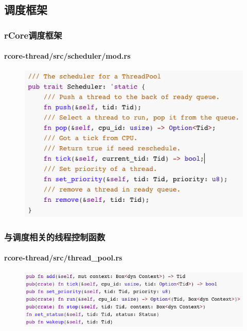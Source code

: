 \subsection{调度框架} %
\begin{frame}[fragile]
    \frametitle{rCore调度框架}
    \framesubtitle{rcore-thread/src/scheduler/mod.rs}
    \begin{figure}
    \includegraphics[width=0.65\linewidth]{figs/Scheduler.png}
    \end{figure}
\end{frame}
% 
% 
% 
% 
\begin{frame}[fragile]
    \frametitle{与调度相关的线程控制函数}
    \framesubtitle{rcore-thread/src/thread\_pool.rs}
    \begin{figure}
    \includegraphics[width=1.0\linewidth]{figs/thread-pool-scheduler.png}
    \end{figure}
\end{frame}
